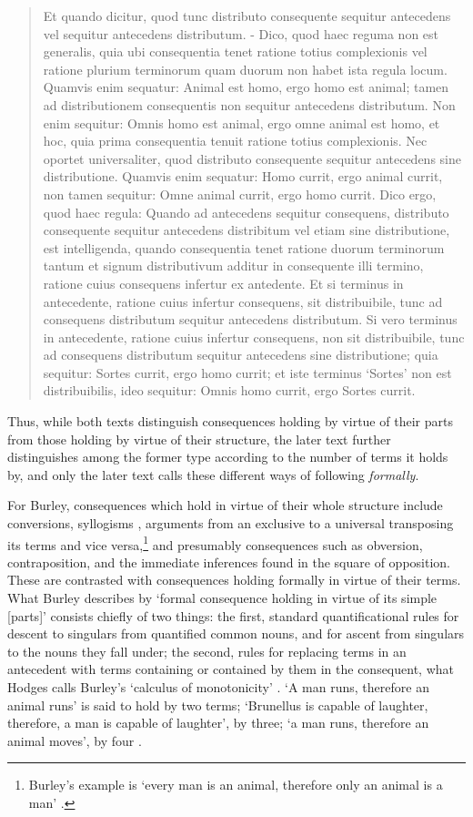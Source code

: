 \documentclass[]{birkjour}
\begin{document}
{\begin{quote}
		Et quando dicitur, quod tunc distributo consequente sequitur antecedens vel sequitur antecedens distributum. - Dico, quod haec reguma non est generalis, quia ubi consequentia tenet ratione totius complexionis vel ratione plurium terminorum quam duorum non habet ista regula locum. Quamvis enim sequatur: Animal est homo, ergo homo est animal; tamen ad distributionem consequentis non sequitur antecedens distributum. Non enim sequitur: Omnis homo est animal, ergo omne animal est homo, et hoc, quia prima consequentia tenuit ratione totius complexionis. Nec oportet universaliter, quod distributo consequente sequitur antecedens sine distributione. Quamvis enim sequatur: Homo currit, ergo animal currit, non tamen sequitur: Omne animal currit, ergo homo currit. Dico ergo, quod haec regula: Quando ad antecedens sequitur consequens, distributo consequente sequitur antecedens distribitum vel etiam sine distributione, est intelligenda, quando consequentia tenet ratione duorum terminorum tantum et signum distributivum additur in consequente illi termino, ratione cuius consequens infertur ex antedente. Et si terminus in antecedente, ratione cuius infertur consequens, sit distribuibile, tunc ad consequens distributum sequitur antecedens distributum. Si vero terminus in antecedente, ratione cuius infertur consequens, non sit distribuibile, tunc ad consequens distributum sequitur antecedens sine distributione; quia sequitur: Sortes currit, ergo homo currit; et iste terminus `Sortes' non est distribuibilis, ideo sequitur: Omnis homo currit, ergo Sortes currit.
	\end{quote}} Thus, while both texts distinguish consequences holding by virtue of their parts from those holding by virtue of their structure, the later text further distinguishes among the former type according to the number of terms it holds by, and only the later text calls these different ways of following \textit{formally}.

For Burley, consequences which hold in virtue of their whole structure include conversions, syllogisms \autocite[p. 86.9-12]{BurleyDPAL}, arguments from an exclusive to a universal transposing its terms and vice versa,\footnote{Burley's example is `every man is an animal, therefore only an animal is a man' \autocite[pp. 142-143, par. 118]{Green-Pedersen1980b}.} and presumably consequences such as obversion, contraposition, and the immediate inferences found in the square of opposition. These are contrasted with consequences holding formally in virtue of their terms. What Burley describes by `formal consequence holding in virtue of its simple [parts]' consists chiefly of two things: the first, standard quantificational rules for descent to singulars from quantified common nouns, and for ascent from singulars to the nouns they fall under; the second, rules for replacing terms in an antecedent with terms containing or contained by them in the consequent, what Hodges calls Burley's `calculus of monotonicity' \autocite[pp. 97-99]{HodgesBurley}. `A man runs, therefore an animal runs' is said to hold by two terms; `Brunellus is capable of laughter, therefore, a man is capable of laughter', by three; `a man runs, therefore an animal moves', by four \autocite[p. 84.24-27]{BurleyDPAL}.
\end{document}
